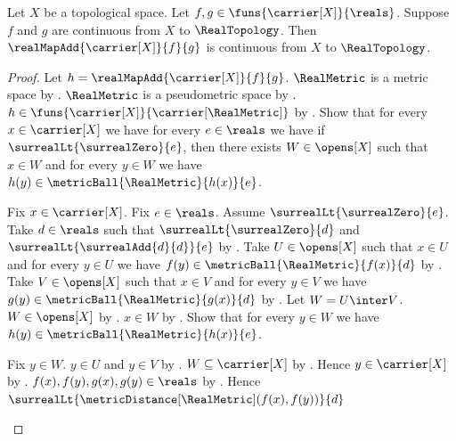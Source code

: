 \begin{theorem}\label{real_map_add_continuous}
    Let $X$ be a topological space.
    Let $f,g\in\funs{\carrier[X]}{\reals}$.
    Suppose $f$ and $g$ are continuous from $X$ to $\RealTopology$.
    Then $\realMapAdd{\carrier[X]}{f}{g}$ is continuous from $X$ to
        $\RealTopology$.
\end{theorem}
\begin{proof}
    Let $h=\realMapAdd{\carrier[X]}{f}{g}$.
    $\RealMetric$ is a metric space by .
    $\RealMetric$ is a pseudometric space by
        .
    $h\in\funs{\carrier[X]}{\carrier[\RealMetric]}$
        by
        .
    Show that for every $x\in\carrier[X]$ we have
        for every $e\in\reals$ we have if
            $\surrealLt{\surrealZero}{e}$, then there exists
            $W\in\opens[X]$ such that $x\in W$ and
            for every $y\in W$ we have
                $h(y)\in\metricBall{\RealMetric}{h(x)}{e}$.
    \begin{subproof}
        Fix $x\in\carrier[X]$.
        Fix $e\in\reals$.
        Assume $\surrealLt{\surrealZero}{e}$.
        Take $d\in\reals$ such that $\surrealLt{\surrealZero}{d}$ and
            $\surrealLt{\surrealAdd{d}{d}}{e}$
            by .
        Take $U\in\opens[X]$ such that $x\in U$ and
            for every $y\in U$ we have
                $f(y)\in\metricBall{\RealMetric}{f(x)}{d}$
            by
            .
        Take $V\in\opens[X]$ such that $x\in V$ and
            for every $y\in V$ we have
                $g(y)\in\metricBall{\RealMetric}{g(x)}{d}$
            by
            .
        Let $W=U\inter V$.
        $W\in\opens[X]$ by .
        $x\in W$ by .
        Show that for every $y\in W$ we have
            $h(y)\in\metricBall{\RealMetric}{h(x)}{e}$.
        \begin{subproof}
            Fix $y\in W$.
            $y\in U$ and $y\in V$ by .
            $W\subseteq\carrier[X]$ by .
            Hence $y\in\carrier[X]$ by .
            $f(x),f(y),g(x),g(y)\in\reals$
                by .
            Hence
                $\surrealLt{\metricDistance[\RealMetric](f(x),f(y))}{d}$

\end{subproof}
\end{subproof}
\end{proof}
